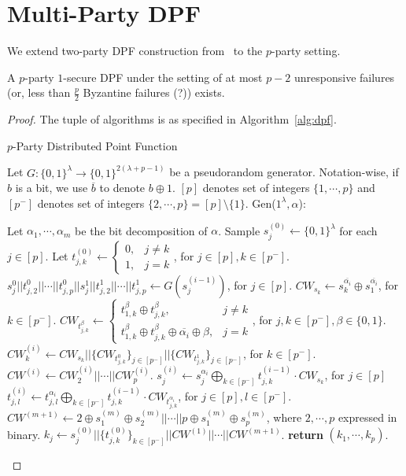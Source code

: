 \documentclass[11pt]{article}
\newcommand{\Gen}{\textsf{Gen}}
\begin{document}
\section{Multi-Party DPF}
We extend two-party DPF construction from~\cite{bgi18} to the $p$-party setting.
\begin{theorem}
A $p$-party $1$-secure DPF under the setting of at most $p-2$ unresponsive failures (or, less than $\frac{p}{2}$ Byzantine failures (?)) exists.
\end{theorem}
\begin{proof}
The tuple of algorithms is as specified in Algorithm~\ref{alg:dpf}.



\begin{algorithm}
\caption{$p$-Party Distributed Point Function}\label{alg:dpf}
Let $G : \{0,1\}^\lambda \to \{0,1\}^{2(\lambda + p - 1)}$ be a pseudorandom generator. Notation-wise, if $b$ is a bit, we use $\overline{b}$ to denote $b \oplus 1$. $[p]$ denotes set of integers $\{1, \cdots, p\}$ and $[p^-]$ denotes set of integers $\{2, \cdots, p\} = [p] \setminus \{1\}$.
\vspace{10px}
\newline
\Gen($1^\lambda, \alpha$):
\begin{algorithmic}[1]
\State Let $\alpha_1, \cdots, \alpha_m$ be the bit decomposition of $\alpha$.
\State Sample $s_j^{(0)} \leftarrow \{0,1\}^{\lambda}$ for each $j \in [p]$.
\State Let $t_{j,k}^{(0)} \leftarrow \begin{cases} 0, & j \neq k\\ 1, & j = k\end{cases}$, for $j \in [p], k \in [p^-]$.
\State $s_j^0||t_{j,2}^0||\cdots||t_{j,p}^0||s_j^{1}||t_{j,2}^1||\cdots||t_{j,p}^1 \leftarrow G(s_j^{(i-1)})$, for $j \in [p]$.
\State $CW_{s_k} \leftarrow s_k^{\overline{\alpha_i}} \oplus s_1^{\overline{\alpha_i}}$, for $k \in [p^-]$.
\State $CW_{t_{j,k}^\beta} \leftarrow \begin{cases} t_{1,k}^\beta \oplus t_{j,k}^\beta, & j \neq k \\ t^\beta_{1,k} \oplus t^\beta_{j,k} \oplus \overline{\alpha_i} \oplus \beta, & j = k\end{cases}$, for $j,k \in [p^-], \beta \in \{0,1\}$.
\State $CW^{(i)}_k \leftarrow CW_{s_k}||\{CW_{t_{j,k}^0}\}_{j \in [p^-]}||\{CW_{t_{j,k}^1}\}_{j \in [p^-]}$, for $k \in [p^-]$.
\State $CW^{(i)} \leftarrow CW_2^{(i)} || \cdots || CW_p^{(i)}$.
\State $s_j^{(i)} \leftarrow s_j^{\alpha_i} \bigoplus_{k \in [p^-]} t_{j,k}^{(i-1)} \cdot CW_{s_k}$, for $j \in [p]$
\State $t_{j,l}^{(i)} \leftarrow t_{j,l}^{\alpha_i} \bigoplus_{k \in [p^-]} t_{j,k}^{(i-1)} \cdot CW_{t_{j,k}^{\alpha_i}}$, for $j \in [p], l \in [p^-]$.
\EndFor
\State $CW^{(m+1)} \leftarrow 2 \oplus s_1^{(m)} \oplus s_2^{(m)} || \cdots || p \oplus s_1^{(m)} \oplus s_p^{(m)}$, where $2, \cdots, p$ expressed in binary.
\State $k_j \leftarrow s_j^{(0)}||\{t_{j,k}^{(0)}\}_{k \in [p^-]}||CW^{(1)}||\cdots||CW^{(m+1)}$.
\State \textbf{return} $(k_1, \cdots, k_p)$.
\end{algorithmic}


\end{algorithm}
\end{proof}
\end{document}
